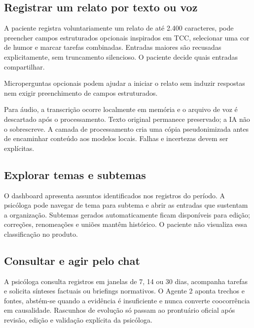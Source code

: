 \documentclass[11pt,a4paper]{article}
\begin{document}
\subsection{Registrar um relato por texto ou voz}
A paciente registra voluntariamente um relato de até 2.400 caracteres, pode preencher campos estruturados opcionais inspirados em TCC, selecionar uma cor de humor e marcar tarefas combinadas. Entradas maiores são recusadas explicitamente, sem truncamento silencioso. O paciente decide quais entradas compartilhar.

Microperguntas opcionais podem ajudar a iniciar o relato sem induzir respostas nem exigir preenchimento de campos estruturados.

Para áudio, a transcrição ocorre localmente em memória e o arquivo de voz é descartado após o processamento. Texto original permanece preservado; a IA não o sobrescreve. A camada de processamento cria uma cópia pseudonimizada antes de encaminhar conteúdo aos modelos locais. Falhas e incertezas devem ser explícitas.

\subsection{Explorar temas e subtemas}
O dashboard apresenta assuntos identificados nos registros do período. A psicóloga pode navegar de tema para subtema e abrir as entradas que sustentam a organização. Subtemas gerados automaticamente ficam disponíveis para edição; correções, renomeações e uniões mantêm histórico. O paciente não visualiza essa classificação no produto.

\subsection{Consultar e agir pelo chat}
A psicóloga consulta registros em janelas de 7, 14 ou 30 dias, acompanha tarefas e solicita sínteses factuais ou briefings normativos. O Agente 2 aponta trechos e fontes, abstém-se quando a evidência é insuficiente e nunca converte coocorrência em causalidade. Rascunhos de evolução só passam ao prontuário oficial após revisão, edição e validação explícita da psicóloga.
\end{document}
